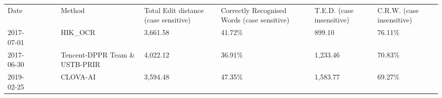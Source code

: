 \documentclass[12pt]{article}
\begin{document}
 
\begin{table}[] 
\begin{tabular}{|l|l|l|l|l|l|l|l|l|} 
\hline 
 & & & & & & & &  \\ \hline 
Date & & & &Method &Total Edit distance (case sensitive) &Correctly Recognised Words (case sensitive) &T.E.D. (case insensitive) &C.R.W. (case insensitive)  \\ \hline 
2017-07-01 & & & &HIK\_OCR &3,661.58 &41.72\% &899.10 &76.11\%  \\ \hline 
2017-06-30 & & & &Tencent-DPPR Team \& USTB-PRIR &4,022.12 &36.91\% &1,233.46 &70.83\%  \\ \hline 
2019-02-25 & & & &CLOVA-AI &3,594.48 &47.35\% &1,583.77 &69.27\%  \\ \hline 
\end{tabular}
\end{table} 
\end{document}
